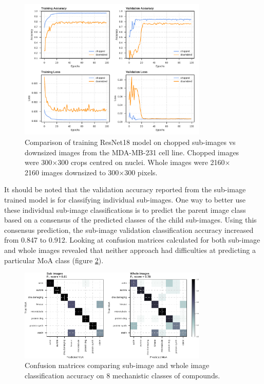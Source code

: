 \documentclass[a4paper,11pt,twoside,openright]{scrbook}
\begin{document}
\begin{figure}
    \includegraphics[width=0.8\textwidth]{ch2choppedVsWhole}
    \captionsetup{width=0.8\textwidth}
    \caption[Comparison of whole images vs sub-images]{
Comparison of training ResNet18 model on chopped sub-images vs downsized images from the MDA-MB-231 cell line.
Chopped images were 300$\times$300 crops centred on nuclei.
Whole images were 2160$\times$2160 images downsized to 300$\times$300 pixels.
}
    \label{figure:nn_chopped_vs_whole_curves}
\end{figure}


It should be noted that the validation accuracy reported from the sub-image trained model is for classifying individual sub-images.
One way to better use these individual sub-image classifications is to predict the parent image class based on a consensus of the predicted classes of the child sub-images.
Using this consensus prediction, the sub-image validation classification accuracy increased from 0.847 to 0.912.
Looking at confusion matrices calculated for both sub-image and whole images revealed that neither approach had difficulties at predicting a particular MoA class (figure \ref{figure:nn_chopped_vs_whole_cm}).


\begin{figure}
    \includegraphics[width=0.8\textwidth]{ch2choppedWholeCM}
    \captionsetup{width=0.8\textwidth}
    \caption[Sub image and whole image confusion matrices]{
Confusion matrices comparing sub-image and whole image classification accuracy on 8 mechanistic classes of compounds.
}
    \label{figure:nn_chopped_vs_whole_cm}
\end{figure}
\end{document}
